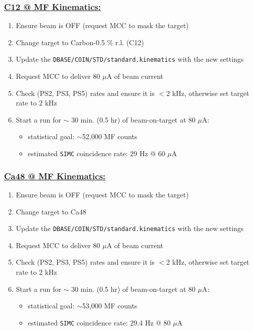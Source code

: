 \documentclass{article}
\begin{document}
\subsubsection*{\underline{C12 @ MF Kinematics:}}
\begin{enumerate}
\item Ensure beam is OFF (request MCC to mask the target)
\item Change target to Carbon-0.5 \% r.l. (C12)
\item Update the \texttt{DBASE/COIN/STD/standard.kinematics} with the new settings
\item Request MCC to deliver 80 $\mu$A of beam current
\item Check (PS2, PS3, PS5) rates and ensure it is $<$2 kHz, otherwise set target rate to 2 kHz
\item Start a run for $\sim$ 30 min. (0.5 hr) of beam-on-target at 80 $\mu$A:
\begin{itemize}
    \item statistical goal: $\sim$52,000 MF counts
    \item estimated \texttt{SIMC} coincidence rate: 29 Hz @ 60 $\mu$A
\end{itemize}
\end{enumerate}

\subsubsection*{\underline{Ca48 @ MF Kinematics:}}
\begin{enumerate}
\item Ensure beam is OFF (request MCC to mask the target)
\item Change target to Ca48
\item Update the \texttt{DBASE/COIN/STD/standard.kinematics} with the new settings
\item Request MCC to deliver 80 $\mu$A of beam current
\item Check (PS2, PS3, PS5) rates and ensure it is $<$2 kHz, otherwise set target rate to 2 kHz
\item Start a run for $\sim$ 30 min. (0.5 hr) of beam-on-target at 80 $\mu$A:
\begin{itemize}
    \item statistical goal: $\sim$53,000 MF counts
    \item estimated \texttt{SIMC} coincidence rate: 29.4 Hz @ 80 $\mu$A
\end{itemize}
\end{enumerate}
\end{document}
